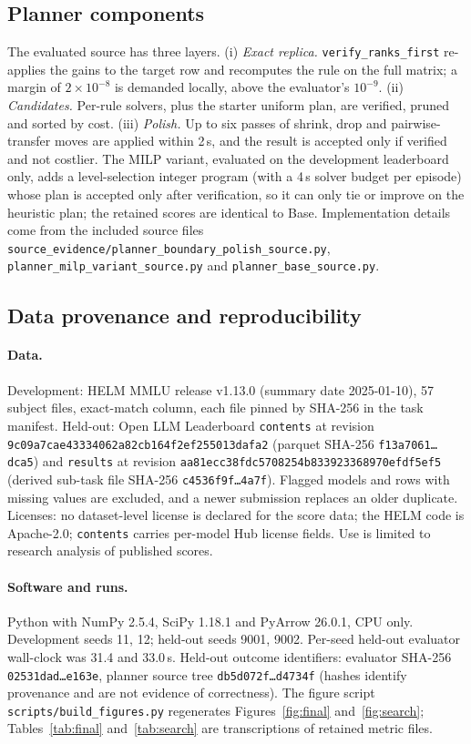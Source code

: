 \documentclass{article}
\begin{document}
\subsection{Planner components}
The evaluated source has three layers. (i) \emph{Exact replica.} \texttt{verify\_ranks\_first} re-applies the gains to the target row and recomputes the rule on the full matrix; a margin of $2\times10^{-8}$ is demanded locally, above the evaluator's $10^{-9}$. (ii) \emph{Candidates.} Per-rule solvers, plus the starter uniform plan, are verified, pruned and sorted by cost. (iii) \emph{Polish.} Up to six passes of shrink, drop and pairwise-transfer moves are applied within 2\,s, and the result is accepted only if verified and not costlier. The MILP variant, evaluated on the development leaderboard only, adds a level-selection integer program (with a 4\,s solver budget per episode) whose plan is accepted only after verification, so it can only tie or improve on the heuristic plan; the retained scores are identical to Base. Implementation details come from the included source files \texttt{source\_evidence/planner\_boundary\_polish\_source.py}, \texttt{planner\_milp\_variant\_source.py} and \texttt{planner\_base\_source.py}.

\subsection{Data provenance and reproducibility}\label{app:repro}
\paragraph{Data.} Development: HELM MMLU release v1.13.0 (summary date 2025-01-10), 57 subject files, exact-match column, each file pinned by SHA-256 in the task manifest. Held-out: Open LLM Leaderboard \texttt{contents} at revision \texttt{9c09a7cae43334062a82cb164f2ef255013dafa2} (parquet SHA-256 \texttt{f13a7061\ldots dca5}) and \texttt{results} at revision \texttt{aa81ecc38fdc5708254b833923368970efdf5ef5} (derived sub-task file SHA-256 \texttt{c4536f9f\ldots 4a7f}). Flagged models and rows with missing values are excluded, and a newer submission replaces an older duplicate. Licenses: no dataset-level license is declared for the score data; the HELM code is Apache-2.0; \texttt{contents} carries per-model Hub license fields. Use is limited to research analysis of published scores.

\paragraph{Software and runs.} Python with NumPy 2.5.4, SciPy 1.18.1 and PyArrow 26.0.1, CPU only. Development seeds 11, 12; held-out seeds 9001, 9002. Per-seed held-out evaluator wall-clock was 31.4 and 33.0\,s. Held-out outcome identifiers: evaluator SHA-256 \texttt{02531dad\ldots e163e}, planner source tree \texttt{db5d072f\ldots d4734f} (hashes identify provenance and are not evidence of correctness). The figure script \texttt{scripts/build\_figures.py} regenerates Figures~\ref{fig:final} and~\ref{fig:search}; Tables~\ref{tab:final} and~\ref{tab:search} are transcriptions of retained metric files.
\end{document}
